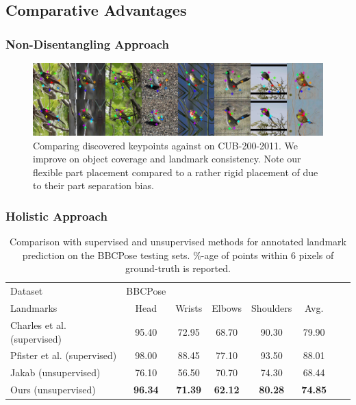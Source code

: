	\subsection{Comparative Advantages}
		\begin{frame}[t]
		\frametitle{Non-Disentangling Approach}
			\begin{figure}[htp]
				\centering
				\includegraphics[trim={0cm 0cm 0cm 0cm},clip, width=1.\linewidth]{fig/shape/comp}
				\caption{Comparing discovered keypoints against \cite{zhang18} on CUB-200-2011. We improve on object coverage and landmark consistency. Note our flexible part placement compared to a rather rigid placement of \cite{zhang18} due to their part separation bias.}
				\label{fig:compare}
			\end{figure}
		\end{frame}

		\begin{frame}[t]
		\frametitle{Holistic Approach}
			\begin{table}[htp]
				\centering
				\begin{tabular}{l|ccccccr}
				\hline
				Dataset & BBCPose &  &  &  & &  &  \\
				Landmarks & {\footnotesize Head} & {\footnotesize Wrists} &  {\footnotesize Elbows }& {\footnotesize Shoulders } & {\footnotesize Avg.}  \\
				\hline
				Charles et al. \cite{charles13bbcpose}  (supervised)&
				95.40 & 72.95 & 68.70 & 90.30 & 79.90  \\
				Pfister et al.  \cite{pfister15flowingconv} (supervised) &
				98.00 & 88.45 & 77.10 & 93.50 & 88.01  \\ \hline
				Jakab \cite{jakab18}  (unsupervised) &
				76.10& 56.50& 70.70& 74.30 &68.44  \\
				Ours (unsupervised)  & \textbf{96.34} & \textbf{71.39} & \textbf{62.12} & \textbf{80.28}& \textbf{74.85} \\
				\hline
				\end{tabular}
				\caption{{Comparison with supervised and unsupervised methods for annotated landmark prediction on the BBCPose testing sets.
				\%-age of points within 6 pixels of ground-truth is reported.}}
				\label{tab:gtregressionhuman}
			\end{table}
		\end{frame}

